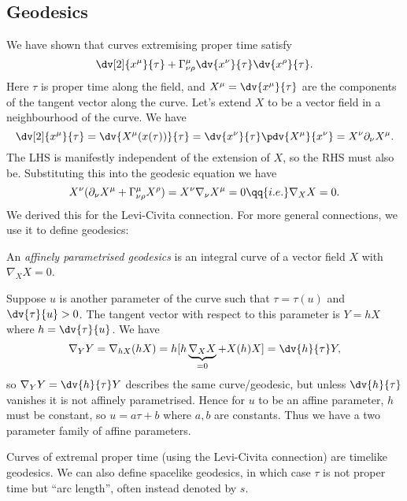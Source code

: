\documentclass{jknotes}
\begin{document}
\subsection{Geodesics}
We have shown that curves extremising proper time satisfy
\begin{equation}
    \dv[2]{x^\mu}{\tau} + \Gamma^\mu_{\nu\rho}\dv{x^\nu}{\tau}\dv{x^\rho}{\tau}.
\end{equation}
Here \(\tau\) is proper time along the field, and \(X^\mu = \dv{x^\mu}{\tau}\) are the components of the tangent vector along the curve. Let's extend \(X\) to be a vector field in a neighbourhood of the curve. We have
\begin{equation}
    \dv[2]{x^\mu}{\tau} = \dv{X^\mu(x(\tau))}{\tau} = \dv{x^\nu}{\tau}\pdv{X^\mu}{x^\nu} = X^\nu\partial_\nu X^\mu.
\end{equation}
The LHS is manifestly independent of the extension of \(X\), so the RHS must also be. Substituting this into the geodesic equation we have
\begin{equation}
    X^\nu(\partial_\nu X^\mu + \Gamma^\mu_{\nu\rho}X^\rho) = X^\nu\nabla_\nu X^\mu = 0 \qq{i.e.} \nabla_X X = 0.
\end{equation}
We derived this for the Levi-Civita connection. For more general connections, we use it to define geodesics:
\begin{defn}
    An \emph{affinely parametrised geodesics} is an integral curve of a vector field \(X\) with \(\nabla_X X = 0\).
\end{defn}

Suppose \(u\) is another parameter of the curve such that \(\tau = \tau(u)\) and \(\dv{\tau}{u} > 0\). The tangent vector with respect to this parameter is \(Y=hX\) where \(h = \dv{\tau}{u}\). We have
\begin{equation}
    \nabla_Y Y = \nabla_{hX}(hX) = h [h \underbrace{\nabla_X X}_{=0} + X(h) X] = \dv{h}{\tau} Y,
\end{equation}
so \(\nabla_Y Y = \dv{h}{\tau} Y\) describes the same curve/geodesic, but unless \(\dv{h}{\tau}\) vanishes it is not affinely parametrised. Hence for \(u\) to be an affine parameter, \(h\) must be constant, so \(u = a\tau + b\) where \(a,b\) are constants. Thus we have a two parameter family of affine parameters.

Curves of extremal proper time (using the Levi-Civita connection) are timelike geodesics. We can also define spacelike geodesics, in which case \(\tau\) is not proper time but ``arc length'', often instead denoted by \(s\).
\end{document}
